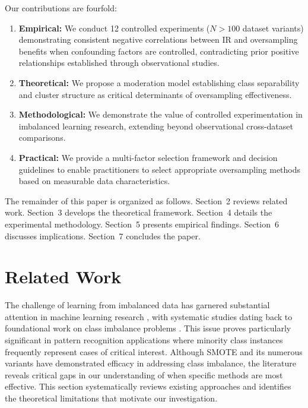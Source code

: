 \documentclass[12pt,a4paper]{article}
\theoremstyle{definition}
\begin{document}
Our contributions are fourfold:
\begin{enumerate}
 \item \textbf{Empirical:} We conduct 12 controlled experiments ($N>100$ dataset variants) demonstrating consistent negative correlations between IR and oversampling benefits when confounding factors are controlled, contradicting prior positive relationships established through observational studies.
 
 \item \textbf{Theoretical:} We propose a moderation model establishing class separability and cluster structure as critical determinants of oversampling effectiveness.
 
 \item \textbf{Methodological:} We demonstrate the value of controlled experimentation in imbalanced learning research, extending beyond observational cross-dataset comparisons.
 
 \item \textbf{Practical:} We provide a multi-factor selection framework and decision guidelines to enable practitioners to select appropriate oversampling methods based on measurable data characteristics.
\end{enumerate}

The remainder of this paper is organized as follows. Section~2 reviews related work. Section~3 develops the theoretical framework. Section~4 details the experimental methodology. Section~5 presents empirical findings. Section~6 discusses implications. Section~7 concludes the paper.

\section{Related Work}
\indent The challenge of learning from imbalanced data has garnered substantial attention in machine learning research \cite{he2009learning,guo2017learning}, with systematic studies dating back to foundational work on class imbalance problems \cite{japkowicz2002class,chawla2004special}. This issue proves particularly significant in pattern recognition applications where minority class instances frequently represent cases of critical interest. Although SMOTE and its numerous variants have demonstrated efficacy in addressing class imbalance, the literature reveals critical gaps in our understanding of when specific methods are most effective. This section systematically reviews existing approaches and identifies the theoretical limitations that motivate our investigation.
\end{document}
